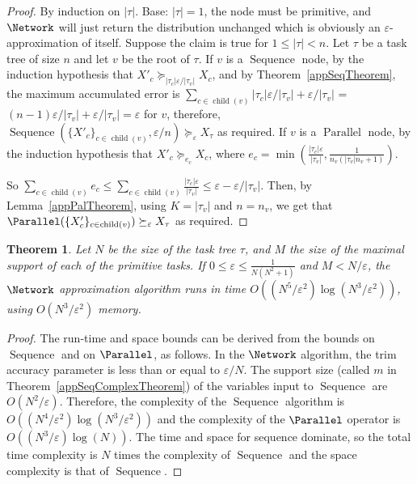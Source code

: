 \documentclass[review]{elsarticle}
\newtheorem{theorem}{Theorem}
\DeclareMathOperator{\Sequence}{Sequence}
\DeclareMathOperator{\ch}{\operatorname{child}}
\begin{document}
\begin{proof} 
By induction on $|\tau|$. 
Base: $|\tau|=1$, the node must be primitive, and $\Network$ will just return the distribution unchanged which is obviously an $\varepsilon$-approximation
of itself. Suppose the claim is true for $1 \leq |\tau| < n$. Let $\tau$ be a task tree of size $n$ and let $v$ be the root of $\tau$. If $v$ is a $\operatorname{Sequence}$ node, by the induction hypothesis that $X'_c\succeq_{|\tau_c|\varepsilon/|\tau_v|} X_{c}$, and by Theorem~\ref{appSeqTheorem}, the maximum accumulated error is 
$\sum_{c \in \ch(v)}
{|\tau_c|\varepsilon}/|\tau_v| + {\varepsilon}/|\tau_v|$ = $(n-1)\varepsilon/|\tau_v|+{\varepsilon}/|\tau_v|= \varepsilon$ for $v$, therefore, $\Sequence(\{X'_c\}_{c\in \ch(v)}, {\varepsilon}/{n}) \succeq_\varepsilon X_\tau$ as required. 
If $v$ is a $\operatorname{Parallel}$ node, by the induction hypothesis that $X'_c  \succeq_{e_c} X_{c}$, where $e_c = \min(\frac{|\tau_{c}|\varepsilon}{|\tau_v|}, \frac{1}{n_v (|\tau_v| n_v+1)})$. 
 
\noindent So $\sum_{c\in \ch(v)} e_c \leq   \sum_{c\in \ch(v)} \frac{|\tau_{c}|\varepsilon}{|\tau_v|}  \leq \varepsilon  - \varepsilon/ |\tau_v|  $. Then, by Lemma~\ref{appPalTheorem}, using $K=|\tau_v|$ and $n=n_v$, we get that $\Parallel(\{X'_c\}_{c\in \ch(v)})\succeq_\varepsilon  X_\tau$ as required. 
\end{proof}



\begin{theorem}\label{th:TTalgcomplexity}
Let  $N$ be the size of the  task tree  $\tau$,  and $M$ the size of the maximal support of each of the primitive tasks.
If $0 \leq \varepsilon \leq \frac{1}{N (N^2+1)}$ and $M < N/\varepsilon$, the  $\Network$ approximation algorithm 
runs in time $O((N^5 /\varepsilon^2)\log(N^3/\varepsilon^2))$, using
$O(N^3/\varepsilon^2) $ memory.
\end{theorem}

\begin{proof}
The run-time and space bounds can be derived from the bounds on $\Sequence$ and on $\Parallel$, as follows. In the $\Network$ algorithm, the trim accuracy parameter is less than or equal to ${\varepsilon}/{N}$. 
The support size (called $m$ in Theorem~\ref{appSeqComplexTheorem}) of the variables input to $\Sequence$ are $O(N^2/\varepsilon)$.
Therefore, the complexity of the $\Sequence$ algorithm is 
$O((N^4 /\varepsilon^2)\log(N^3/\varepsilon^2))$ and the complexity of the $\Parallel$ operator is $O((N^3/\varepsilon)\log(N))$. The time and space for sequence dominate, so the total time complexity is $N$ times the complexity of $\Sequence$ and the space complexity is that of $\Sequence$.
\end{proof}
\end{document}

